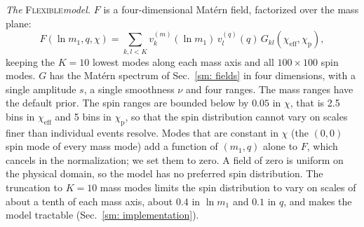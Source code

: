 \documentclass[%
 onecolumn,
 amsmath,amssymb,
 aps,
 prl,
 nofootinbib,nobibnotes,
]{revtex4-2}
\newcommand{\chieff}{\ensuremath{\chi_{\mathrm{eff}}}}
\newcommand{\chip}{\ensuremath{\chi_{\mathrm{p}}}}
\newcommand{\flexiblespins}{\textsc{Flexible}\xspace}
\begin{document}
\textit{The} \flexiblespins \textit{model.} $F$ is a four-dimensional Mat\'ern field, factorized over the mass plane:
\begin{equation}
    F(\ln m_1, q, \chi) = \sum_{k, l < K} v^{(m)}_k(\ln m_1)\, v^{(q)}_l(q)\, G_{kl}(\chieff, \chip),
\end{equation}
keeping the $K = 10$ lowest modes along each mass axis and all $100 \times 100$ spin modes. $G$ has the Mat\'ern spectrum of Sec.~\ref{sm: fields} in four dimensions, with a single amplitude $s$, a single smoothness $\nu$ and four ranges. The mass ranges have the default prior. The spin ranges are bounded below by $0.05$ in $\chi$, that is 2.5 bins in $\chieff$ and 5 bins in $\chip$, so that the spin distribution cannot vary on scales finer than individual events resolve. Modes that are constant in $\chi$ (the $(0, 0)$ spin mode of every mass mode) add a function of $(m_1, q)$ alone to $F$, which cancels in the normalization; we set them to zero. A field of zero is uniform on the physical domain, so the model has no preferred spin distribution. The truncation to $K = 10$ mass modes limits the spin distribution to vary on scales of about a tenth of each mass axis, about $0.4$ in $\ln m_1$ and $0.1$ in $q$, and makes the model tractable (Sec.~\ref{sm: implementation}).
\end{document}

